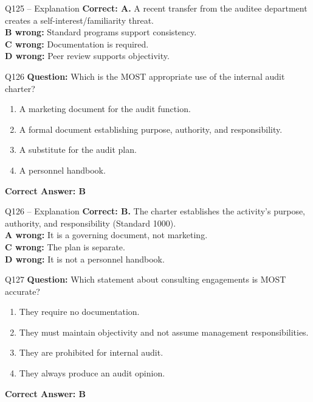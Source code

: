 \documentclass[aspectratio=169,10pt]{beamer}
\begin{document}
	\begin{frame}[t]{Q125 -- Explanation}
		\small
		\textbf{Correct: A.} A recent transfer from the auditee department creates a self-interest/familiarity threat. \\[4pt]
		\textbf{B wrong:} Standard programs support consistency. \\[2pt]
		\textbf{C wrong:} Documentation is required. \\[2pt]
		\textbf{D wrong:} Peer review supports objectivity.
	\end{frame}
	
	\begin{frame}[t]{Q126}
		\small
		\textbf{Question:} Which is the MOST appropriate use of the internal audit charter?
		\begin{enumerate}[label=\Alph*.,itemsep=1pt,topsep=2pt]
			\item A marketing document for the audit function.
			\item A formal document establishing purpose, authority, and responsibility.
			\item A substitute for the audit plan.
			\item A personnel handbook.
		\end{enumerate}
		\vspace{4pt}
		\textbf{Correct Answer: B}
	\end{frame}
	
	\begin{frame}[t]{Q126 -- Explanation}
		\small
		\textbf{Correct: B.} The charter establishes the activity's purpose, authority, and responsibility (Standard 1000). \\[4pt]
		\textbf{A wrong:} It is a governing document, not marketing. \\[2pt]
		\textbf{C wrong:} The plan is separate. \\[2pt]
		\textbf{D wrong:} It is not a personnel handbook.
	\end{frame}
	
	\begin{frame}[t]{Q127}
		\small
		\textbf{Question:} Which statement about consulting engagements is MOST accurate?
		\begin{enumerate}[label=\Alph*.,itemsep=1pt,topsep=2pt]
			\item They require no documentation.
			\item They must maintain objectivity and not assume management responsibilities.
			\item They are prohibited for internal audit.
			\item They always produce an audit opinion.
		\end{enumerate}
		\vspace{4pt}
		\textbf{Correct Answer: B}
	\end{frame}
	
\end{document}
